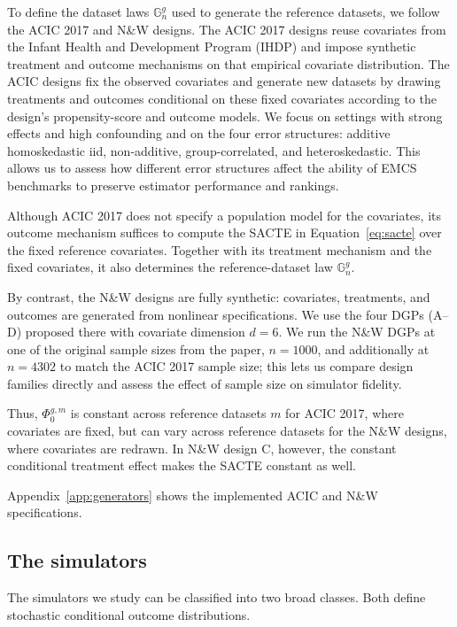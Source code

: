 To define the dataset laws \(\mathbb G_n^{g}\) used to generate the reference datasets, we follow the ACIC 2017 and N\&W designs. The ACIC 2017 designs \cite{hahnAtlanticCausalInference2019} reuse covariates from the Infant Health and Development Program (IHDP) and impose synthetic treatment and outcome mechanisms on that empirical covariate distribution. The ACIC designs fix the observed covariates and generate new datasets by drawing treatments and outcomes conditional on these fixed covariates according to the design's propensity-score and outcome models. We focus on settings with strong effects and high confounding and on the four error structures: additive homoskedastic iid, non-additive, group-correlated, and heteroskedastic. This allows us to assess how different error structures affect the ability of EMCS benchmarks to preserve estimator performance and rankings.

Although ACIC 2017 does not specify a population model for the covariates, its outcome mechanism suffices to compute the SACTE in Equation~\eqref{eq:sacte} over the fixed reference covariates. Together with its treatment mechanism and the fixed covariates, it also determines the reference-dataset law \(\mathbb G_n^{g}\).

By contrast, the N\&W designs \cite{nieQuasioracleEstimationHeterogeneous2021}
are fully synthetic: covariates, treatments, and outcomes are generated from nonlinear specifications. We use the four DGPs (A--D) proposed there with covariate dimension $d=6$. We run the N\&W DGPs at one of the original sample sizes from the paper, $n=1000$, and additionally at $n=4302$ to match the ACIC 2017 sample size; this lets us compare design families directly and assess the effect of sample size on simulator fidelity.

Thus, \(\Phi_0^{g,m}\) is constant across reference datasets \(m\) for ACIC 2017, where covariates are fixed, but can vary across reference datasets for the N\&W designs, where covariates are redrawn. In N\&W design C, however, the constant conditional treatment effect makes the SACTE constant as well.

Appendix~\ref{app:generators} shows the implemented ACIC and N\&W specifications.

\subsection{The simulators}

The simulators we study can be classified into two broad classes. Both define stochastic conditional outcome distributions.

